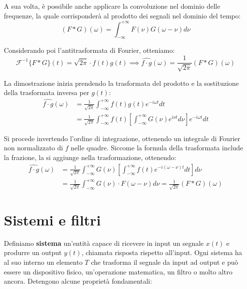 \noindent A sua volta, è possibile anche applicare la convoluzione nel dominio delle frequenze, la quale corrisponderà al prodotto dei segnali nel
dominio del tempo: \[
    (F*G)(\omega) = \int_{-\infty}^{+\infty}F(\nu)G(\omega-\nu)d\nu
\]

\noindent Considerando poi l'antitrasformata di Fourier, otteniamo: \[
    \mathcal{F}^{-1}\{F*G\}(t) = \sqrt{2\pi}\cdot f(t)g(t) \implies \widehat{f\cdot g}(\omega) = \frac{1}{\sqrt{2\pi}} (F*G)(\omega)
\]

\noindent La dimostrazione inizia prendendo la trasformata del prodotto e la sostituzione della trasformata inversa per $g(t)$: \begin{equation}
    \begin{split}
        \widehat{f\cdot g}(\omega) &= \frac{1}{\sqrt{2\pi}} \int_{-\infty}^{+\infty} f(t)g(t) e^{-i\omega t} dt\\
            &= \frac{1}{\sqrt{2\pi}} \int_{-\infty}^{+\infty} f(t) \left[\int_{-\infty}^{+\infty} G(\nu)e^{i\nu t} d\nu\right]e^{-i\omega t} dt
    \end{split}
\end{equation}

\noindent Si procede invertendo l'ordine di integrazione, ottenendo un integrale di Fourier non normalizzato di $f$ nelle quadre. Siccome la formula
della trasformata include la frazione, la si aggiunge nella trasformazione, ottenendo: \begin{equation}
    \begin{split}
        \widehat{f\cdot g}(\omega) &= \frac{1}{\sqrt{2\pi}} \int_{-\infty}^{+\infty} G(\nu) \left[\int_{-\infty}^{+\infty} f(t)e^{-i(\omega-\nu) t} dt
                \right]d\nu\\
            &= \frac{1}{\sqrt{2\pi}} \int_{-\infty}^{+\infty} G(\nu)\cdot F(\omega-\nu) d\nu = \frac{1}{\sqrt{2\pi}} (F*G)(\omega)
    \end{split}
\end{equation}

%

\section{Sistemi e filtri}
Definiamo \textbf{sistema} un'entità capace di ricevere in input un segnale $x(t)$ e produrre un output $y(t)$, chiamata risposta rispetto all'input.
Ogni sistema ha al suo interno un elemento $T$ che trasforma il segnale da input ad output e può essere un dispositivo fisico, un'operazione matematica,
un filtro o molto altro ancora. Detengono alcune proprietà fondamentali:

